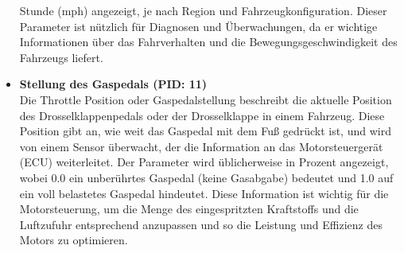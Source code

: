\documentclass[oneside]{ausarbeitung}
\begin{document}
\begin{itemize}
  Stunde (mph) angezeigt, je nach Region und Fahrzeugkonfiguration. Dieser Parameter ist nützlich für Diagnosen und Überwachungen, 
  da er wichtige Informationen über das Fahrverhalten und die Bewegungsgeschwindigkeit des Fahrzeugs liefert.
  \item \textbf{Stellung des Gaspedals (PID: 11)} \\ Die Throttle Position oder Gaspedalstellung beschreibt die aktuelle Position
  des Drosselklappenpedals oder der Drosselklappe in einem Fahrzeug. Diese Position gibt an, wie weit das Gaspedal mit dem
  Fuß gedrückt ist, und wird von einem Sensor überwacht, der die Information an das Motorsteuergerät (ECU) weiterleitet.
  Der Parameter wird üblicherweise in Prozent angezeigt, wobei 0.0 ein unberührtes Gaspedal (keine Gasabgabe) bedeutet 
  und 1.0 auf ein voll belastetes Gaspedal hindeutet. Diese Information ist wichtig für die Motorsteuerung, um die Menge
  des eingespritzten Kraftstoffs und die Luftzufuhr entsprechend anzupassen und so die Leistung und Effizienz des Motors 
  zu optimieren.
\end{itemize}
\end{document}
